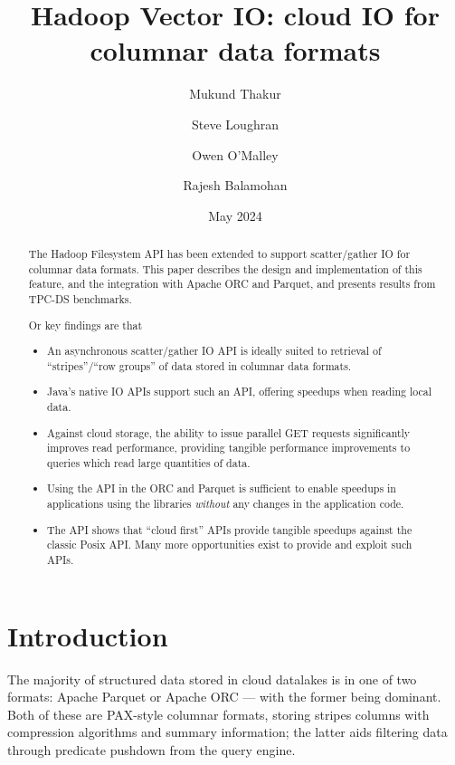 \documentclass[manuscript]{acmart}
\title[Hadoop Vector IO]{Hadoop Vector IO: cloud IO for columnar data formats}
\author{Mukund Thakur}
\author{Steve Loughran}
\author{Owen O'Malley}
\author{Rajesh Balamohan}
\date{May 2024}
\begin{document}

\begin{abstract}
The Hadoop Filesystem API has been extended to support scatter/gather IO
for columnar data formats.
This paper describes the design and implementation of this feature,
and the integration with Apache ORC and Parquet, and
presents results from TPC-DS benchmarks.

Or key findings are that
\begin{itemize}
  \item An asynchronous scatter/gather IO API is ideally suited to retrieval
  of ``stripes''/``row groups'' of data stored in columnar data formats.
  \item Java's native IO APIs support such an API, offering speedups when reading
  local data.
  \item Against cloud storage, the ability to issue parallel GET requests
        significantly improves read performance, providing tangible performance
        improvements to queries which read large quantities of data.
  \item Using the API in the ORC and Parquet is sufficient to enable
        speedups in applications using the libraries \emph{without} any
        changes in the application code.
  \item The API shows that ``cloud first'' APIs provide tangible speedups
        against the classic Posix API. Many more opportunities exist to
        provide and exploit such APIs.
\end{itemize}

\end{abstract}



\maketitle


\section{Introduction}
\label{sec:introduction}

The majority of structured data stored in cloud datalakes is in one of two formats: Apache Parquet or Apache ORC --- with the former being dominant.
Both of these are PAX-style columnar formats, storing stripes columns with compression algorithms and summary information; the latter aids filtering data through predicate pushdown from the query engine.
\end{document}
